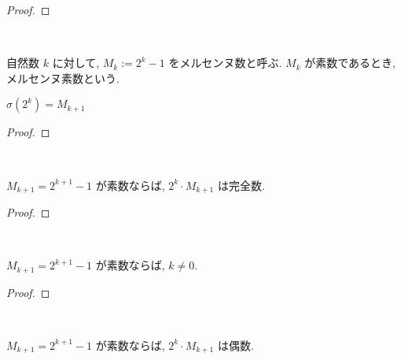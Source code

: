 \begin{proof}

\end{proof}


\begin{definition}[メルセンヌ数]\label{mersenne}\leanok~\

自然数 \(k\) に対して, \(M_k := 2^k - 1\) をメルセンヌ数と呼ぶ. \(M_k\) が素数であるとき,メルセンヌ素数という.

\end{definition}


\begin{lemma}\label{sigma_two_pow_eq_mersenne_succ}\leanok

\(\sigma(2^k) = M_{k+1}\)

\end{lemma}

\begin{proof}

\end{proof}


\begin{theorem}[Euclid I]\label{perfect_two_pow_mul_mersenne_of_prime}
  \leanok~\

\(M_{k+1} = 2^{k+1} - 1\) が素数ならば, \(2^k \cdot M_{k+1}\) は完全数.

\end{theorem}

\begin{proof}

\end{proof}


\begin{lemma}\label{ne_zero_of_prime_mersenne}\leanok~\

\(M_{k+1} = 2^{k+1} - 1\) が素数ならば, \(k \neq 0\).

\end{lemma}

\begin{proof}

\end{proof}


\begin{theorem}\label{even_two_pow_mul_mersenne_of_prime}
\leanok~\

\(M_{k+1} = 2^{k+1} - 1\) が素数ならば, \(2^k \cdot M_{k+1}\) は偶数.

\end{theorem}

